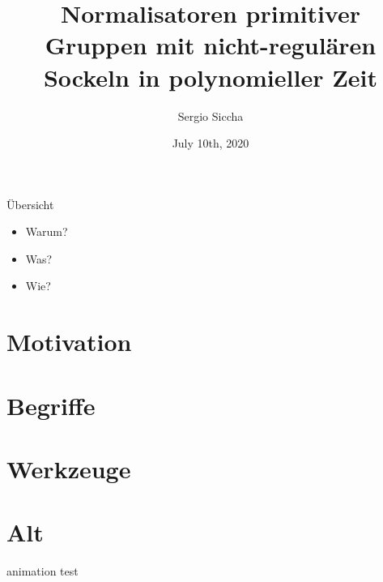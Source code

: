 \documentclass{beamer}
\title{Normalisatoren primitiver Gruppen mit nicht-regulären
Sockeln in polynomieller Zeit}
\date{July 10th, 2020}
\author{Sergio Siccha}
\theoremstyle{plain}
\theoremstyle{definition}
\begin{document}
\maketitle
{}



\begin{frame}{Übersicht}
\begin{itemize}
\setlength{\itemsep}{\fill}
\item Warum?
\item Was?
\item Wie?
\end{itemize}
\end{frame}

\section{Motivation}


\section{Begriffe}


\section{Werkzeuge}


\section{Alt}



\begin{frame}{animation test}
\begin{center}
\end{center}
\end{frame}
\end{document}
